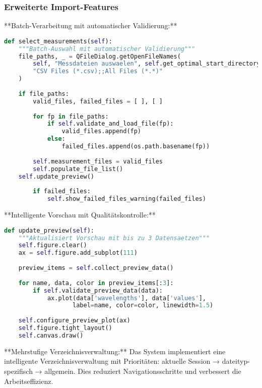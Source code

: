 \subsubsection{Erweiterte Import-Features}

**Batch-Verarbeitung mit automatischer Validierung:**
\begin{lstlisting}[language=Python, caption=Intelligente Batch-Dateiverarbeitung]
def select_measurements(self):
    """Batch-Auswahl mit automatischer Validierung"""
    file_paths, _ = QFileDialog.getOpenFileNames(
        self, "Messdateien auswaelen", self.get_optimal_start_directory(),
        "CSV Files (*.csv);;All Files (*.*)"
    )
    
    if file_paths:
        valid_files, failed_files = [ ], [ ]
        
        for fp in file_paths:
            if self.validate_and_load_file(fp):
                valid_files.append(fp)
            else:
                failed_files.append(os.path.basename(fp))
        
        self.measurement_files = valid_files
        self.populate_file_list()
    self.update_preview()
        
        if failed_files:
            self.show_failed_files_warning(failed_files)
\end{lstlisting}

**Intelligente Vorschau mit Qualitätskontrolle:**
\begin{lstlisting}[language=Python, caption=Erweiterte Datenvorschau]
def update_preview(self):
    """Aktualisiert Vorschau mit bis zu 3 Datensaetzen"""
    self.figure.clear()
    ax = self.figure.add_subplot(111)
    
    preview_items = self.collect_preview_data()
    
    for name, data, color in preview_items[:3]:
        if self.validate_preview_data(data):
            ax.plot(data['wavelengths'], data['values'], 
                   label=name, color=color, linewidth=1.5)
    
    self.configure_preview_plot(ax)
    self.figure.tight_layout()
    self.canvas.draw()
\end{lstlisting}

**Mehrstufige Verzeichnisverwaltung:**
Das System implementiert eine intelligente Verzeichnisverwaltung mit Prioritäten: aktuelle Session → dateityp-spezifisch → allgemein. Dies reduziert Navigationsschritte und verbessert die Arbeitseffizienz.

